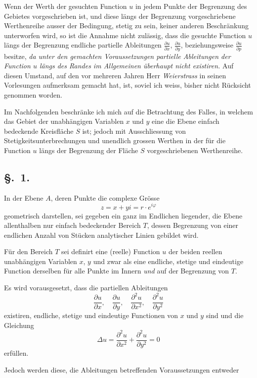 \documentclass{article}
\begin{document}
Wenn der Werth der gesuchten Function $u$ in jedem Punkte der Begrenzung des Gebietes vorgeschrieben ist, und diese längs der Begrenzung vorgeschriebene Werthenreihe ausser der Bedingung, stetig zu sein, keiner anderen Beschränkung unterworfen wird, so ist die Annahme nicht zulässig, dass die gesuchte Function $u$ längs der Begrenzung endliche partielle Ableitungen $\frac{\partial u}{\partial x}$, $\frac{\partial u}{\partial y}$, beziehungsweise $\frac{\partial u}{\partial p}$ besitze, \emph{da unter den gemachten Voraussetzungen partielle Ableitungen der Function $u$ längs des Randes im Allgemeinen überhaupt nicht existiren.} Auf diesen Umstand, auf den vor mehreren Jahren Herr \emph{Weierstrass} in seinen Vorlesungen aufmerksam gemacht hat, ist, soviel ich weiss, bisher nicht Rücksicht genommen worden.

Im Nachfolgenden beschränke ich mich auf die Betrachtung des Falles, in welchem das Gebiet der unabhängigen Variablen $x$ und $y$ eine die Ebene einfach bedeckende Kreisfläche $S$ ist; jedoch mit Ausschliessung von Stetigkeitsunterbrechungen und unendlich grossen Werthen in der für die Function $u$ längs der Begrenzung der Fläche $S$ vorgeschriebenen Werthenreihe.

\subsection*{§.~1.}

In der Ebene $A$, deren Punkte die complexe Grösse
\[
z = x + yi = r \cdot e^{i\varphi}
\]
geometrisch darstellen, sei gegeben ein ganz im Endlichen liegender, die Ebene allenthalben nur einfach bedeckender Bereich $T$, dessen Begrenzung von einer endlichen Anzahl von Stücken analytischer Linien gebildet wird.

Für den Bereich $T$ sei definirt eine (reelle) Function $u$ der beiden reellen unabhängigen Variablen $x$, $y$ und zwar als eine endliche, stetige und eindeutige Function derselben für alle Punkte im Innern \emph{und} auf der Begrenzung von $T$.

Es wird vorausgesetzt, dass die partiellen Ableitungen
\[
\frac{\partial u}{\partial x}, \quad \frac{\partial u}{\partial y}, \quad \frac{\partial^2 u}{\partial x^2}, \quad \frac{\partial^2 u}{\partial y^2}
\]
existiren, endliche, stetige und eindeutige Functionen von $x$ und $y$ sind und die Gleichung
\[
\Delta u = \frac{\partial^2 u}{\partial x^2} + \frac{\partial^2 u}{\partial y^2} = 0
\]
erfüllen.

Jedoch werden diese, die Ableitungen betreffenden Voraussetzungen entweder
\end{document}

